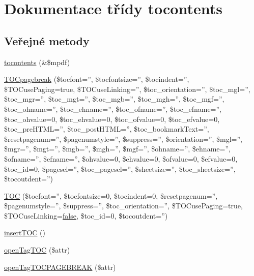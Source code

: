 \hypertarget{classtocontents}{\section{Dokumentace třídy tocontents}
\label{classtocontents}
}
\subsection*{Veřejné metody}
\begin{DoxyCompactItemize}
\item 
\hyperlink{classtocontents_ad11d6e31d018fc6a45a7d834269f9034}{tocontents} (\&\$mpdf)
\item 
\hyperlink{classtocontents_ad3509c4d89dee63947f014b7c4abd750}{T\-O\-Cpagebreak} (\$tocfont='', \$tocfontsize='', \$tocindent='', \$T\-O\-Cuse\-Paging=true, \$T\-O\-Cuse\-Linking='', \$toc\-\_\-orientation='', \$toc\-\_\-mgl='', \$toc\-\_\-mgr='', \$toc\-\_\-mgt='', \$toc\-\_\-mgb='', \$toc\-\_\-mgh='', \$toc\-\_\-mgf='', \$toc\-\_\-ohname='', \$toc\-\_\-ehname='', \$toc\-\_\-ofname='', \$toc\-\_\-efname='', \$toc\-\_\-ohvalue=0, \$toc\-\_\-ehvalue=0, \$toc\-\_\-ofvalue=0, \$toc\-\_\-efvalue=0, \$toc\-\_\-pre\-H\-T\-M\-L='', \$toc\-\_\-post\-H\-T\-M\-L='', \$toc\-\_\-bookmark\-Text='', \$resetpagenum='', \$pagenumstyle='', \$suppress='', \$orientation='', \$mgl='', \$mgr='', \$mgt='', \$mgb='', \$mgh='', \$mgf='', \$ohname='', \$ehname='', \$ofname='', \$efname='', \$ohvalue=0, \$ehvalue=0, \$ofvalue=0, \$efvalue=0, \$toc\-\_\-id=0, \$pagesel='', \$toc\-\_\-pagesel='', \$sheetsize='', \$toc\-\_\-sheetsize='', \$tocoutdent='')
\item 
\hyperlink{classtocontents_a2500e91604c4ec5c1f397ef59c2cda70}{T\-O\-C} (\$tocfont='', \$tocfontsize=0, \$tocindent=0, \$resetpagenum='', \$pagenumstyle='', \$suppress='', \$toc\-\_\-orientation='', \$T\-O\-Cuse\-Paging=true, \$T\-O\-Cuse\-Linking=\hyperlink{ttfontsuni_8php_afbaa04e5cc97693dc668b3c45d3dd740}{false}, \$toc\-\_\-id=0, \$tocoutdent='')
\item 
\hyperlink{classtocontents_a5fdc566b7ec1a51aaa13207a33270eae}{insert\-T\-O\-C} ()
\item 
\hyperlink{classtocontents_a50e967a464c347ce5f6c85cfd59d8866}{open\-Tag\-T\-O\-C} (\$attr)
\item 
\hyperlink{classtocontents_a9b3d72ba70e5d333426def3e693f71cc}{open\-Tag\-T\-O\-C\-P\-A\-G\-E\-B\-R\-E\-A\-K} (\$attr)
\end{DoxyCompactItemize}
